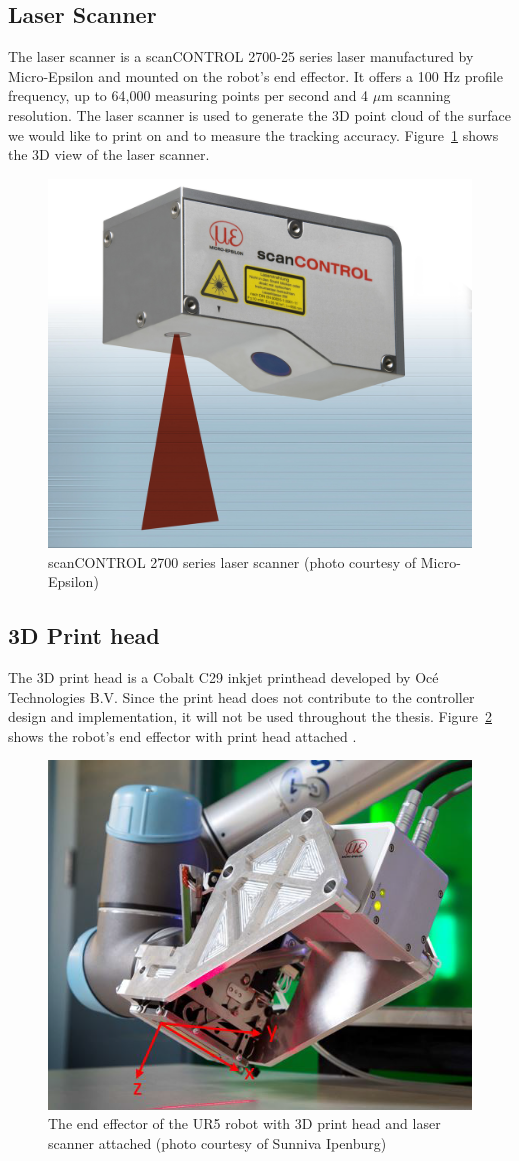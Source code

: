\subsection{Laser Scanner}
The laser scanner is a scanCONTROL 2700-25 series laser manufactured by Micro-Epsilon and mounted on the robot's end effector. It offers a 100 Hz profile frequency, up to 64,000 measuring points per second and 4 $ \mu $m scanning resolution. The laser scanner is used to generate the 3D point cloud of the surface we would like to print on and to measure the tracking accuracy. Figure~\ref{fig:scanCONTROL} shows the 3D view of the laser scanner.

\begin{figure}
	\centering
	\includegraphics[width=0.5\linewidth]{scanCONTROL}
	\caption{scanCONTROL 2700 series laser scanner (photo courtesy of Micro-Epsilon)}
	\label{fig:scanCONTROL}
\end{figure}

\subsection{3D Print head}
The 3D print head is a Cobalt C29 inkjet printhead developed by Oc{\'e} Technologies B.V.  Since the print head does not contribute to the controller design and implementation, it will not be used throughout the thesis. Figure~\ref{fig:ur5-endeffector} shows the robot's end effector with print head attached \cite{sunniva2013}.


\begin{figure}
\centering
\includegraphics[width=0.5\linewidth]{ur5}
\caption{The end effector of the UR5 robot with 3D print head and laser scanner attached (photo courtesy of Sunniva Ipenburg)}
\label{fig:ur5-endeffector}
\end{figure}

